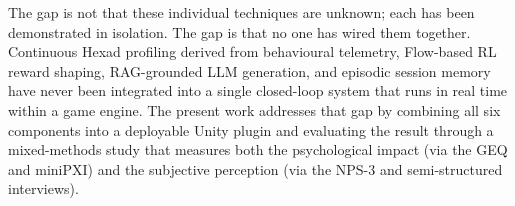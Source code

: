 The gap is not that these individual techniques are unknown; each has been demonstrated in isolation. The gap is that no one has wired them together. Continuous Hexad profiling derived from behavioural telemetry, Flow-based RL reward shaping, RAG-grounded LLM generation, and episodic session memory have never been integrated into a single closed-loop system that runs in real time within a game engine. The present work addresses that gap by combining all six components into a deployable Unity plugin and evaluating the result through a mixed-methods study that measures both the psychological impact (via the GEQ and miniPXI) and the subjective perception (via the NPS-3 and semi-structured interviews).
